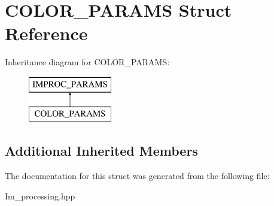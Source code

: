 \hypertarget{struct_c_o_l_o_r___p_a_r_a_m_s}{\section{C\+O\+L\+O\+R\+\_\+\+P\+A\+R\+A\+M\+S Struct Reference}
\label{struct_c_o_l_o_r___p_a_r_a_m_s}
}
Inheritance diagram for C\+O\+L\+O\+R\+\_\+\+P\+A\+R\+A\+M\+S\+:\begin{figure}[H]
\begin{center}
\leavevmode
\includegraphics[height=2.000000cm]{struct_c_o_l_o_r___p_a_r_a_m_s}
\end{center}
\end{figure}
\subsection*{Additional Inherited Members}


The documentation for this struct was generated from the following file\+:\begin{DoxyCompactItemize}
\item 
Im\+\_\+processing.\+hpp\end{DoxyCompactItemize}
